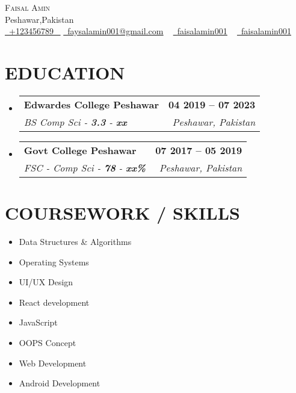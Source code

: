 \documentclass[letterpaper,11pt]{article}
\makeatletter
\newcommand{\resumeSubheading}[4]{
  \vspace{-2pt}\item
    \begin{tabular*}{1.0\textwidth}[t]{l@{\extracolsep{\fill}}r}
      \textbf{\large#1} & \textbf{\small #2} \\
      \textit{\large#3} & \textit{\small #4} \\
      
    \end{tabular*}\vspace{-7pt}
}
\newcommand{\resumeSubHeadingListStart}{\begin{itemize}[leftmargin=0.0in, label={}]}
\newcommand{\resumeSubHeadingListEnd}{\end{itemize}}
\makeatother
\begin{document}


\begin{center}
    {\Huge \scshape Faisal Amin } \\ \vspace{1pt}
    Peshawar,Pakistan \\ \vspace{1pt}
    \small \href{tel:123456789}{ \raisebox{-0.1\height}\faPhone\ \underline{+123456789} ~} \href{mailto:faysalamin001@gmail.com}{\raisebox{-0.2\height}\faEnvelope\  \underline{faysalamin001@gmail.com}} ~ 
    \href{https://linkedin.com/in/yourid}{\raisebox{-0.2\height}\faLinkedinSquare\ \underline{faisalamin001}}  ~
    \href{https://github.com/yourid}{\raisebox{-0.2\height}\faGithub\ \underline{faisalamin001}}
    \vspace{-8pt}
\end{center}


\section{EDUCATION}
 \vspace{3pt}

  \resumeSubHeadingListStart
    \resumeSubheading
      {Edwardes College Peshawar}{04 2019 -- 07 2023}
      {BS Comp Sci - \textbf{3.3} - \textbf{xx}}{Peshawar, Pakistan}
  \resumeSubHeadingListEnd
  
  \resumeSubHeadingListStart
    \resumeSubheading
      {Govt College Peshawar}{07 2017 -- 05 2019}
      {FSC - Comp Sci  - \textbf{78} - \textbf{xx\%}}{Peshawar, Pakistan}
  \resumeSubHeadingListEnd
\vspace{7pt}
\section{COURSEWORK / SKILLS}
     \vspace{5pt}

        \begin{multicols}{4}
            \begin{itemize}[itemsep=-2pt, parsep=5pt]
                \item Data Structures \& Algorithms
                \item Operating Systems
                \item UI/UX Design
                \item React development
                \item JavaScript
                \item OOPS Concept
                \item Web Development
                \item Android Development
            \end{itemize}
        \end{multicols}
        \vspace*{2.0\multicolsep}
\end{document}
